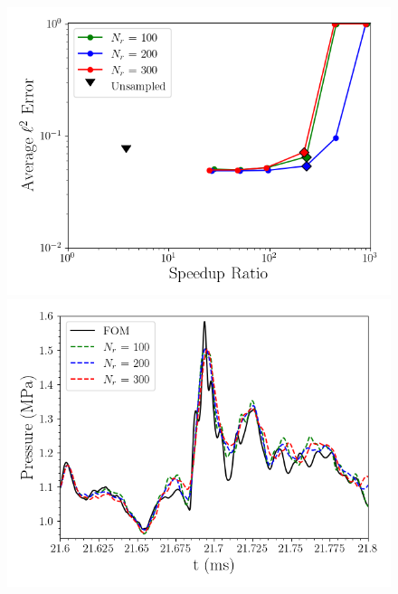 \begin{figure}
	\begin{minipage}{0.49\linewidth}
		\includegraphics[width=0.99\linewidth]{Chapters/HPROMResults/Images/nineElem/deim/sampled_dt5e-7_Average_errorRaw_pareto.png}
	\end{minipage}
	\begin{minipage}{0.49\linewidth}
		\includegraphics[width=0.99\linewidth]{Chapters/HPROMResults/Images/nineElem/deim/pressure_probe_deim_random_modes.png}
	\end{minipage}
\end{figure}